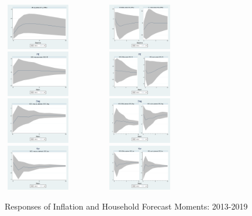 \documentclass[]{article}
\begin{document}
\begin{figure}[ht]
	\centering
	\includegraphics[width=3cm,height=2cm]{figures/CPIAU_ashocks_nmpM.png}  
	\includegraphics[width=6cm,height=2cm]{figures/CPIAU_ashocksM.png} \\
	\smallskip
	\includegraphics[width=3cm,height=2cm]{figures/SCEFE_ashocks_nmpM.png} 
	\includegraphics[width=6cm,height=2cm]{figures/SCEFE_ashocksM.png} \\
	\smallskip
	\includegraphics[width=3cm,height=2cm]{figures/SCEDisg_ab_ashocks_nmpM.png} 
	\includegraphics[width=6cm,height=2cm]{figures/SCEDisg_ab_ashocksM.png} \\
	\smallskip 
	\includegraphics[width=3cm,height=2cm]{figures/SCEVar_ab_ashocks_nmpM.png} 
	\includegraphics[width=6cm,height=2cm]{figures/SCEVar_ab_ashocksM.png} 
	\caption{ Responses of Inflation and Household Forecast Moments: 2013-2019}
	\label{SCE_IR}
\end{figure}
\end{document}

